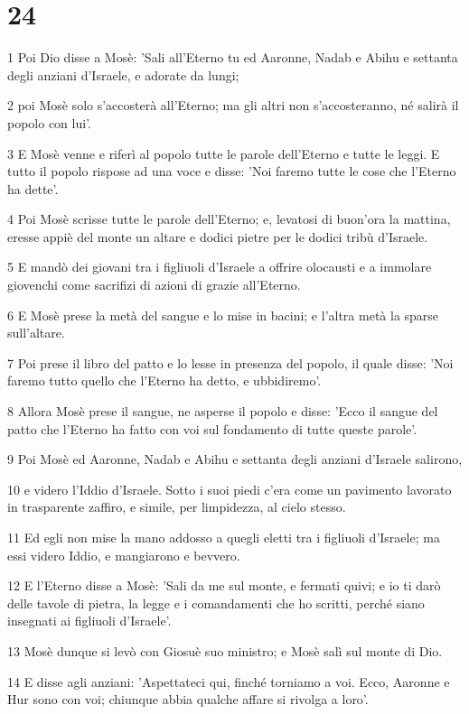 \chapter{24}

\par 1 Poi Dio disse a Mosè: 'Sali all'Eterno tu ed Aaronne, Nadab e Abihu e settanta degli anziani d'Israele, e adorate da lungi;
\par 2 poi Mosè solo s'accosterà all'Eterno; ma gli altri non s'accosteranno, né salirà il popolo con lui'.
\par 3 E Mosè venne e riferì al popolo tutte le parole dell'Eterno e tutte le leggi. E tutto il popolo rispose ad una voce e disse: 'Noi faremo tutte le cose che l'Eterno ha dette'.
\par 4 Poi Mosè scrisse tutte le parole dell'Eterno; e, levatosi di buon'ora la mattina, eresse appiè del monte un altare e dodici pietre per le dodici tribù d'Israele.
\par 5 E mandò dei giovani tra i figliuoli d'Israele a offrire olocausti e a immolare giovenchi come sacrifizi di azioni di grazie all'Eterno.
\par 6 E Mosè prese la metà del sangue e lo mise in bacini; e l'altra metà la sparse sull'altare.
\par 7 Poi prese il libro del patto e lo lesse in presenza del popolo, il quale disse: 'Noi faremo tutto quello che l'Eterno ha detto, e ubbidiremo'.
\par 8 Allora Mosè prese il sangue, ne asperse il popolo e disse: 'Ecco il sangue del patto che l'Eterno ha fatto con voi sul fondamento di tutte queste parole'.
\par 9 Poi Mosè ed Aaronne, Nadab e Abihu e settanta degli anziani d'Israele salirono,
\par 10 e videro l'Iddio d'Israele. Sotto i suoi piedi c'era come un pavimento lavorato in trasparente zaffiro, e simile, per limpidezza, al cielo stesso.
\par 11 Ed egli non mise la mano addosso a quegli eletti tra i figliuoli d'Israele; ma essi videro Iddio, e mangiarono e bevvero.
\par 12 E l'Eterno disse a Mosè: 'Sali da me sul monte, e fermati quivi; e io ti darò delle tavole di pietra, la legge e i comandamenti che ho scritti, perché siano insegnati ai figliuoli d'Israele'.
\par 13 Mosè dunque si levò con Giosuè suo ministro; e Mosè salì sul monte di Dio.
\par 14 E disse agli anziani: 'Aspettateci qui, finché torniamo a voi. Ecco, Aaronne e Hur sono con voi; chiunque abbia qualche affare si rivolga a loro'.
